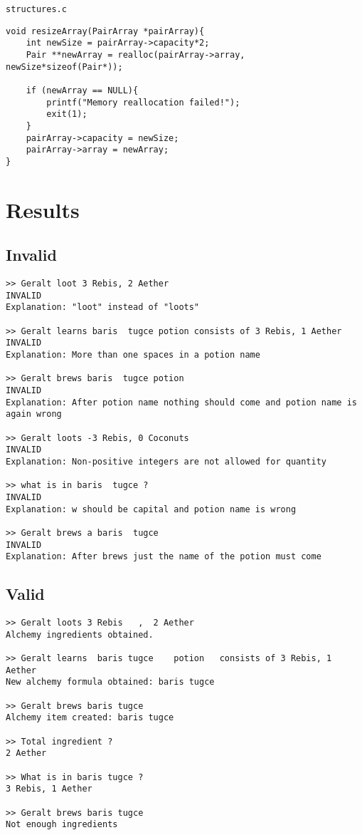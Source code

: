 \documentclass[a4paper,12pt]{article}
\begin{document}
\texttt{structures.c}
\begin{lstlisting}[style=CStyle]
void resizeArray(PairArray *pairArray){
    int newSize = pairArray->capacity*2;
    Pair **newArray = realloc(pairArray->array, newSize*sizeof(Pair*));

    if (newArray == NULL){
        printf("Memory reallocation failed!");
        exit(1);
    }
    pairArray->capacity = newSize;
    pairArray->array = newArray;
}
\end{lstlisting}


\section{Results}


\subsection{Invalid}
\begin{verbatim}
>> Geralt loot 3 Rebis, 2 Aether
INVALID
Explanation: "loot" instead of "loots"

>> Geralt learns baris  tugce potion consists of 3 Rebis, 1 Aether
INVALID
Explanation: More than one spaces in a potion name

>> Geralt brews baris  tugce potion
INVALID
Explanation: After potion name nothing should come and potion name is again wrong

>> Geralt loots -3 Rebis, 0 Coconuts
INVALID
Explanation: Non-positive integers are not allowed for quantity

>> what is in baris  tugce ?
INVALID
Explanation: w should be capital and potion name is wrong

>> Geralt brews a baris  tugce
INVALID
Explanation: After brews just the name of the potion must come
\end{verbatim}

\subsection{Valid}
\begin{verbatim}
>> Geralt loots 3 Rebis   ,  2 Aether
Alchemy ingredients obtained.

>> Geralt learns  baris tugce    potion   consists of 3 Rebis, 1 Aether
New alchemy formula obtained: baris tugce

>> Geralt brews baris tugce
Alchemy item created: baris tugce

>> Total ingredient ?
2 Aether

>> What is in baris tugce ?
3 Rebis, 1 Aether

>> Geralt brews baris tugce
Not enough ingredients
\end{verbatim}
\end{document}

